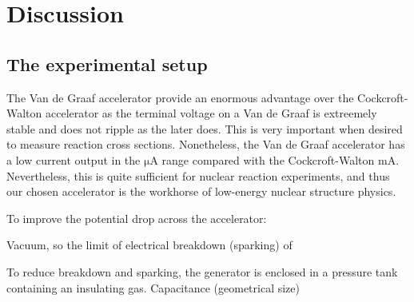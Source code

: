 \section{Discussion}

\subsection{The experimental setup}
The Van de Graaf accelerator provide an enormous advantage over the
Cockcroft-Walton accelerator as the terminal voltage on a Van de Graaf is
extreemely stable and does not ripple as the later does. This is very important
when desired to measure reaction cross sections. Nonetheless, the Van de Graaf
accelerator has a low current output in the $\si{\micro\ampere}$ range compared
with the Cockcroft-Walton $\si{\milli\ampere}$. Nevertheless, this is quite
sufficient for nuclear reaction experiments, and thus our chosen accelerator is
the workhorse of low-energy nuclear structure physics.

To improve the potential drop across the accelerator:

Vacuum, so the limit of electrical breakdown (sparking) of 

To reduce breakdown and sparking, the generator is enclosed in a pressure tank
containing an insulating gas.
Capacitance (geometrical size)

\cite{krane}
